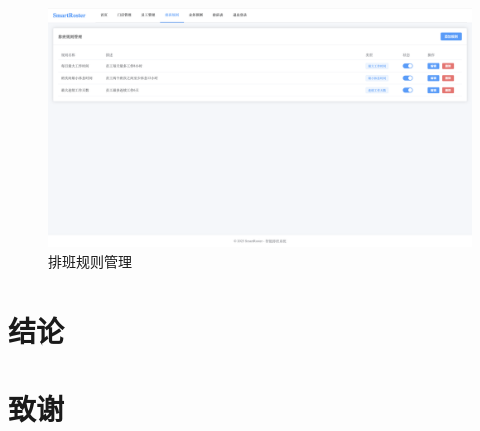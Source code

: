 \documentclass{ctexart}
\begin{document}
\begin{figure}[H]
    \centering
    \includegraphics[width=0.8\linewidth]{./source/排班规则管理.png}
    \caption{排班规则管理}
    \label{fig:microservice-arch}
\end{figure}


\section{结论}


\section*{致谢}



\end{document}
